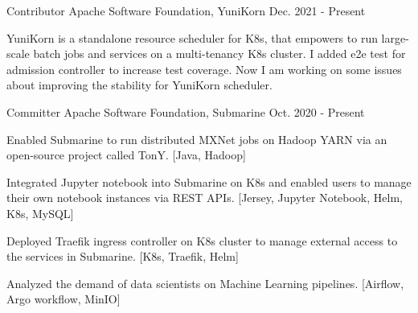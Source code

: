 

\begin{cventries}

  \cventry
    {Contributor} %
    {Apache Software Foundation, YuniKorn} %
    {} %
    {Dec. 2021 - Present} %
    {
      \begin{cvitems} %
        \item {YuniKorn is a standalone resource scheduler for K8s, that empowers to run large-scale batch jobs and services on a multi-tenancy K8s cluster. I added e2e test for admission controller to increase test coverage. Now I am working on some issues about improving the stability for YuniKorn scheduler.}
      \end{cvitems}
    }
  \cventry
    {Committer} %
    {Apache Software Foundation, Submarine} %
    {} %
    {Oct. 2020 - Present} %
    {
      \begin{cvitems} %
        \item {Enabled Submarine to run distributed MXNet jobs on Hadoop YARN via an open-source project called TonY. [Java, Hadoop]}
	\item {Integrated Jupyter notebook into Submarine on K8s and enabled users to manage their own notebook instances via REST APIs. [Jersey, Jupyter Notebook, Helm, K8s, MySQL]}
	\item {Deployed Traefik ingress controller on K8s cluster to manage external access to the services in Submarine. [K8s, Traefik, Helm]}
	\item {Analyzed the demand of data scientists on Machine Learning pipelines. [Airflow, Argo workflow, MinIO]}
      \end{cvitems}
    }
\end{cventries}
